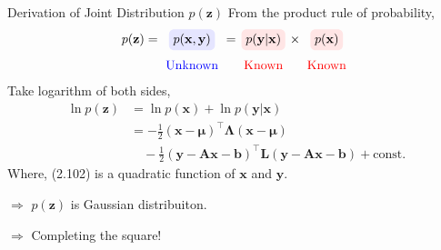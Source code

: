 \documentclass[10pt]{beamer}
\newcommand{\highlightcap}[3][yellow]{\tikz[baseline=(x.base)]{\node[rectangle,rounded corners,fill=#1!10](x){$#2$} node[below of=x, node distance=2em, color=#1]{#3};}}
\begin{document}
    \begin{frame}{Derivation of Joint Distribution $p(\mathbf z)$}
        From the product rule of probability, 
        \begin{align*}
            p(\mathbf z) = 
            \highlightcap[blue]{p(\mathbf x, \mathbf y)}{Unknown}
            = \highlightcap[red]{p(\mathbf y | \mathbf x)}{Known} \times \highlightcap[red]{p(\mathbf x)}{Known}
        \end{align*}
        Take logarithm of both sides, 
        \begin{align*}
            \ln p(\mathbf z) 
            &= \ln p(\mathbf x) + \ln p(\mathbf y | \mathbf x) \\
            &= -\frac{1}{2}(\mathbf x - \bm\mu)^\top\bm\Lambda(\mathbf x - \bm\mu) \\
            &\quad -\frac{1}{2}(\mathbf y - \mathbf A\mathbf x - \mathbf b)^\top\mathbf L(\mathbf y - \mathbf A\mathbf x - \mathbf b)
                + \mathrm{const.} \tag{2.102}
        \end{align*}
        Where, (2.102) is a quadratic function of $\mathbf x$ and $\mathbf y$. \par
        $\Rightarrow$ $p(\mathbf z)$ is Gaussian distribuiton. \par
        $\Rightarrow$ Completing the square!
    \end{frame}
    
\end{document}
